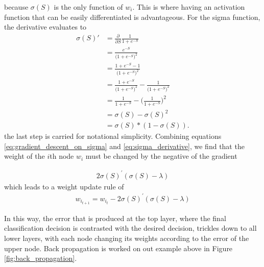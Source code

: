 because $\sigma(S)$ is the only function of $w_i$. This is where having an activation function that can be easily differentiated is advantageous. For the sigma function, the derivative evaluates to
\begin{align}
\label{eq:sigma_derivative}
\sigma(S)\prime &=  \frac{\partial }{\partial S}{\frac{1}{1+e^{-S}}} \\
&= \frac{e^{-S}}{\Big({1+e^{-S}}\Big)^2} \\
&= \frac{1 + e^{-S} - 1}{\Big({1+e^{-S}}\Big)^2} \\
&= \frac{1 + e^{-S}}{\Big({1+e^{-S}}\Big)^2} - \frac{1}{\Big({1+e^{-S}}\Big)^2} \\
&= \frac{1}{{1+e^{-S}}} - \Big(\frac{1}{{1+e^{-S}}}\Big)^2 \\
&= \sigma(S) - \sigma(S)^2 \\
&= \sigma(S) * (1-\sigma(S)).
\label{eq:sigma_derivative}
\end{align}
the last step is carried for notational simplicity. Combining equations \ref{eq:gradient_descent_on_sigma} and \ref{eq:sigma_derivative}, we find that the weight of the $i$th node $w_i$ must be changed by the negative of the gradient

\begin{align*}
  2\sigma(S)^\prime(\sigma(S) - \lambda)
\end{align*}
which leads to a weight update rule of 
\begin{align}
  w_{i_{t+1}} = w_{i_t} - 2\sigma(S)^\prime(\sigma(S) - \lambda)
  \label{eq:update_rule_for_sigma}
\end{align}

In this way, the error that is produced at the top layer, where the final classification decision is contrasted with the desired decision, trickles down to all lower layers, with each node changing its weights according to the error of the upper node. Back propagation is worked on out example above in Figure \ref{fig:back_propagation}.


